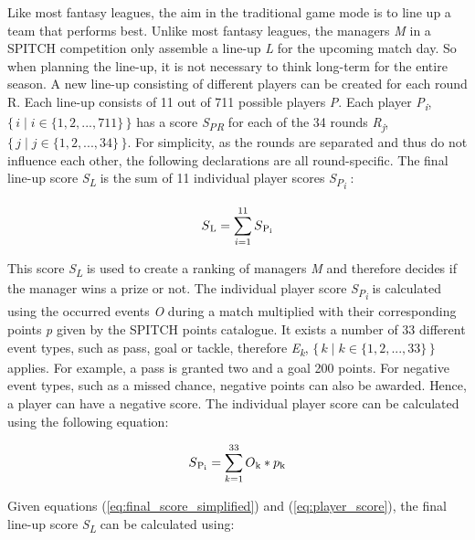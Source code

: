 Like most fantasy leagues, the aim in the traditional game mode is to line up a team that performs best. Unlike most fantasy leagues, the managers \emph{M} in a SPITCH competition only assemble a line-up \emph{L} for the upcoming match day. So when planning the line-up, it is not necessary to think long-term for the entire season. A new line-up consisting of different players can be created for each round R. Each line-up consists of 11 out of 711 possible players \emph{P}. Each player \emph{P\textsubscript{i}}, $\{\,i \mid i \in \{1, 2, ..., 711\}\,\}$ has a score \emph{S\textsubscript{PR}} for each of the 34 rounds \emph{R\textsubscript{j}}, $\{\, j \mid j \in \{1, 2, ..., 34\}\,\}$. For simplicity, as the rounds are separated and thus do not influence each other, the following declarations are all round-specific. The final line-up score \emph{S\textsubscript{L}} is the sum of 11 individual player scores \emph{S\textsubscript{P\textsubscript{i}}} :

\begin{equation}
    S\textsubscript{L} = \sum_{i=1}^{11} S\textsubscript{P\textsubscript{i}}
    \label{eq:final_score_simplified}
\end{equation}

This score \emph{S\textsubscript{L}} is used to create a ranking of managers \emph{M} and therefore decides if the manager wins a prize or not. The individual player score \emph{S\textsubscript{P\textsubscript{i}}} is calculated using the occurred events \emph{O} during a match multiplied with their corresponding points \emph{p} given by the SPITCH points catalogue. It exists a number of 33 different event types, such as pass, goal or tackle, therefore \emph{E\textsubscript{k}}, $\{\, k \mid k \in \{1, 2, ..., 33\}\,\}$ applies. For example, a pass is granted two and a goal 200 points. For negative event types, such as a missed chance, negative points can also be awarded. \parencite[cf.][]{spitch_points_2021} Hence, a player can have a negative score. The individual player score can be calculated using the following equation:

\begin{equation}
    S\textsubscript{P\textsubscript{i}} = \sum_{k=1}^{33} O\textsubscript{k} * p\textsubscript{k}
    \label{eq:player_score}
\end{equation}

Given equations (\ref{eq:final_score_simplified}) and (\ref{eq:player_score}), the final line-up score \emph{S\textsubscript{L}} can be calculated using:

